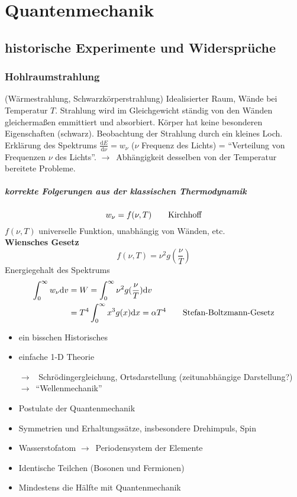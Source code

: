 \documentclass[oneside]{book}
\theoremstyle{definition}
\newcommand{\conseq}{$\rightarrow$~}
\newcommand{\QM}{Quantenmechanik}
\renewcommand{\d}{\mathrm d}
\newcommand{\ddd}[2]{\frac{\d #1}{\d #2}}
\begin{document}
\chapter{Quantenmechanik}
\section{historische Experimente und Widersprüche}
\subsection{Hohlraumstrahlung} (Wärmestrahlung, Schwarzkörperstrahlung)
Idealisierter Raum, Wände bei Temperatur $T$. Strahlung wird im Gleichgewicht ständig von den Wänden gleichermaßen emmittiert und absorbiert. Körper hat keine besonderen Eigenschaften (schwarz). Beobachtung der Strahlung durch ein kleines Loch. Erklärung des Spektrums $\ddd{E}{\nu} = w_\nu$ ($\nu$ Frequenz des Lichts) = "`Verteilung von Frequenzen $\nu$ des Lichts"'.
\conseq Abhängigkeit desselben von der Temperatur bereitete Probleme.

\paragraph{korrekte Folgerungen aus der klassischen Thermodynamik}
$$w_\nu = f(\nu, T) \text{\qquad Kirchhoff}$$
$f(\nu, T)$ universelle Funktion, unabhängig von Wänden, etc.\\
\textbf{Wiensches Gesetz}
$$f(\nu, T) = \nu^2 g(\frac{\nu}{T})$$
Energiegehalt des Spektrums
\begin{align*}
	\int_{0}^{\infty} w_\nu \d v &= W = \int_0^\infty \nu^2 g(\frac{\nu}{T}) \d v\\
	&= T^4 \int_0^\infty x^3 g(x) \d x = \alpha T^4 \text{\qquad Stefan-Boltzmann-Gesetz}
\end{align*}



\begin{itemize}
	\item ein bisschen Historisches
	\item einfache 1-D Theorie
	\item[\conseq] Schrödingergleichung, Ortsdarstellung (zeitunabhängige Darstellung?) \conseq "`Wellenmechanik"'
	\item Postulate der \QM
	\item Symmetrien und Erhaltungssätze, insbesondere Drehimpuls, Spin
	\item Wasserstofatom \conseq Periodensystem der Elemente
	\item Identische Teilchen (Bosonen und Fermionen)
	\item Mindestens die Hälfte mit Quantenmechanik
\end{itemize}
\end{document}
